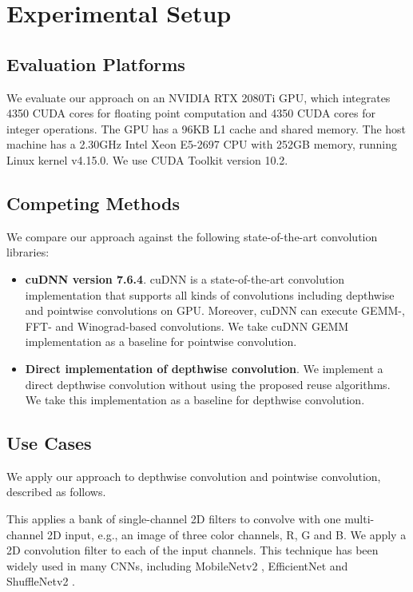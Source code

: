 

\section{Experimental Setup}

\subsection{Evaluation Platforms} We evaluate our approach on an NVIDIA RTX 2080Ti GPU, which integrates 4350 CUDA cores for floating
point computation  and 4350 CUDA cores for integer operations. The GPU has a 96KB L1 cache and shared memory. The host machine has a 2.30GHz
Intel Xeon E5-2697 CPU with 252GB memory, running Linux kernel v4.15.0. We use CUDA Toolkit version 10.2.


\subsection{Competing Methods} We compare our approach against the following state-of-the-art convolution libraries:
\begin{itemize}
  \item \textbf{cuDNN version 7.6.4}. cuDNN is a state-of-the-art convolution implementation that supports all kinds of convolutions including depthwise and pointwise convolutions on GPU. 
  Moreover, cuDNN can execute GEMM-, FFT- and Winograd-based convolutions. We take cuDNN GEMM implementation as a baseline for pointwise convolution.
  \item \textbf{Direct implementation of depthwise convolution}. We implement a direct depthwise convolution without using the proposed reuse algorithms. We take this implementation as a baseline for depthwise convolution.
\end{itemize}

\subsection{Use Cases}
We apply our approach to depthwise convolution and pointwise convolution, described as follows.

 This applies a bank of single-channel 2D filters to convolve with one multi-channel 2D input, e.g., an image of three color channels, R, G and B. We apply a 2D convolution filter to each of the input channels. 
This technique has been widely used in many CNNs, including MobileNetv2 \cite{Sandler_2018_CVPR}, EfficientNet \cite{tan2019efficientnet} and ShuffleNetv2 \cite{Ma_2018_ECCV}.

